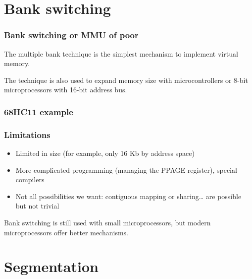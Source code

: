 %
%

\section{Bank switching}


\begin{frame}
  \frametitle{Bank switching or MMU of poor}

  The multiple bank technique is the simplest mechanism to implement
  virtual memory.

  \-

  The technique is also used to expand memory size with
  microcontrollers or 8-bit microprocessors with 16-bit address bus.

\end{frame}


\begin{frame}
  \frametitle{68HC11 example}

  \begin{center}
  \end{center}

\end{frame}


\begin{frame}
  \frametitle{Limitations}

  \begin{itemize}
  \item
    Limited in size (for example, only 16 Kb by address space)
  \item
    More complicated programming (managing the PPAGE register),
    special compilers
  \item
    Not all possibilities we want: contiguous mapping or
    sharing\ldots{} are possible but not trivial
  \end{itemize}

  \-

  Bank switching is still used with small microprocessors, but modern
  microprocessors offer better mechanisms.

\end{frame}

%
%

\section{Segmentation}

